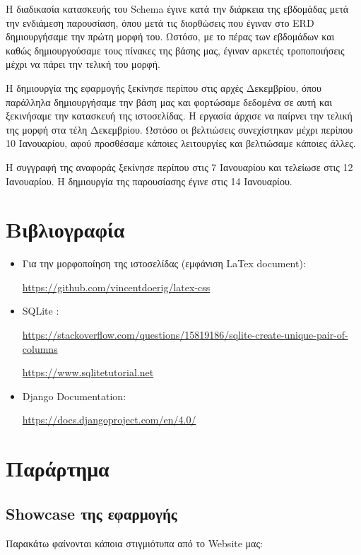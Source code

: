 \documentclass[manuscript,screen,review]{acmart}
\newcommand{\en}[1]{\foreignlanguage{english}{#1}}
\begin{document}
H διαδικασία κατασκευής του \en{Schema} έγινε κατά την διάρκεια της εβδομάδας μετά την ενδιάμεση παρουσίαση, όπου μετά τις διορθώσεις που έγιναν στο \en{ERD} δημιουργήσαμε την πρώτη μορφή του. Ωστόσο, με το πέρας των εβδομάδων και καθώς δημιουργούσαμε τους πίνακες της βάσης μας, έγιναν αρκετές τροποποιήσεις μέχρι να πάρει την τελική του μορφή.

Η δημιουργία της εφαρμογής ξεκίνησε περίπου στις αρχές Δεκεμβρίου, όπου παράλληλα δημιουργήσαμε την βάση μας και φορτώσαμε δεδομένα σε αυτή και ξεκινήσαμε την κατασκευή της ιστοσελίδας.
Η εργασία άρχισε να παίρνει την τελική της μορφή στα τέλη Δεκεμβρίου. Ωστόσο οι βελτιώσεις συνεχίστηκαν μέχρι περίπου 10 Ιανουαρίου, αφού προσθέσαμε κάποιες λειτουργίες και βελτιώσαμε κάποιες άλλες.

Η συγγραφή της αναφοράς ξεκίνησε περίπου στις 7 Ιανουαρίου και τελείωσε στις 12
Ιανουαρίου. H δημιουργία της παρουσίασης έγινε στις 14 Ιανουαρίου.

\section{Βιβλιογραφία}
\begin{itemize}
    \item Για την μορφοποίηση της ιστοσελίδας (εμφάνιση \en{LaTex document}): 
    
    \en{\url{https://github.com/vincentdoerig/latex-css}}
    \item \en{SQLite }:
    
    \en{\url{https://stackoverflow.com/questions/15819186/sqlite-create-unique-pair-of-columns}}
    
    \en{\url{ https://www.sqlitetutorial.net}}
    
    \item \en{Django Documentation}:
    
    \en{\url{https://docs.djangoproject.com/en/4.0/}}
\end{itemize}

\newpage
\section{Παράρτημα}

\subsection{\en{Showcase} της εφαρμογής}
Παρακάτω φαίνονται κάποια στιγμιότυπα από το \en{Website} μας:
\end{document}
